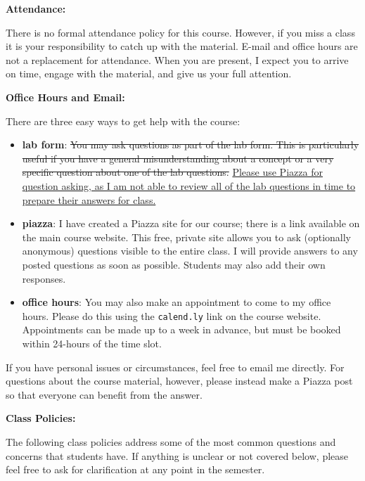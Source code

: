 \documentclass[12pt]{article}
\begin{document}
\vspace{0.4cm}

\textbf{Attendance:} \vspace{6pt}

There is no formal attendance policy for this course. However, if you miss a
class it is your responsibility to catch up with the material. E-mail and
office hours are not a replacement for attendance. When you are present,
I expect you to arrive on time, engage with the material, and give us your
full attention.

\textbf{Office Hours and Email:} \vspace{6pt}

There are three easy ways to get help with the course:

\begin{itemize}
\item \textbf{lab form}: \st{You may ask questions as part of the lab form. This
is particularly useful if you have a general misunderstanding about a concept
or a very specific question about one of the lab questions.} \ul{Please use Piazza
for question asking, as I am not able to review all of the lab questions in time
to prepare their answers for class.}
\item \textbf{piazza}: I have created a Piazza site for our course; there is
a link available on the main course website. This free, private site allows
you to ask (optionally anonymous) questions visible to the entire class. I
will provide answers to any posted questions as soon as possible. Students may
also add their own responses.
\item \textbf{office hours}: You may also make an appointment to come to my
office hours. Please do this using the \texttt{calend.ly} link on the course
website. Appointments can be made up to a week in advance, but must be booked
within 24-hours of the time slot.
\end{itemize}

If you have personal issues or circumstances, feel free to email me directly.
For questions about the course material, however, please instead make a Piazza
post so that everyone can benefit from the answer.

\vspace{0.5cm}

\textbf{Class Policies:} \vspace{6pt}

The following class policies address some of the most common questions and
concerns that students have. If anything is unclear or not covered below,
please feel free to ask for clarification at any point in the semester.
\end{document}

